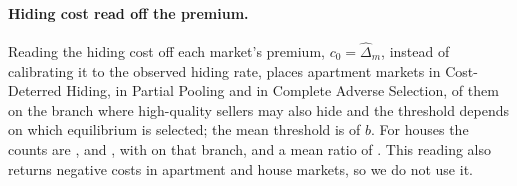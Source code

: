 \paragraph{Hiding cost read off the premium.}
Reading the hiding cost off each market's premium, $c_0=\hat\Delta_m$, instead of calibrating it to the observed hiding rate, places \attRawNCdApt{} apartment markets in Cost-Deterred Hiding, \attRawNPpApt{} in Partial Pooling and \attRawNCasApt{} in Complete Adverse Selection, \attRawNFlagApt{} of them on the branch where high-quality sellers may also hide and the threshold depends on which equilibrium is selected; the mean threshold is \attRawRbarRatioApt{} of $b$. For houses the counts are \attRawNCdHouse{}, \attRawNPpHouse{} and \attRawNCasHouse{}, with \attRawNFlagHouse{} on that branch, and a mean ratio of \attRawRbarRatioHouse{}. This reading also returns negative costs in \attRawNNegApt{} apartment and \attRawNNegHouse{} house markets, so we do not use it.
